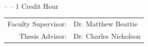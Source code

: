 \begin{titlepage}
    \begin{center}
        \vfill
        \Huge \myassignment \\
        \vspace*{0.5in}
        \Large \mysemester -- \myclass -- 1 Credit Hour\\
        \vspace*{0.5in}
        \myname
        \vfill
        \begin{tabular}{rl}
            Faculty Supervisor: & Dr. Matthew Beattie \\
            Thesis Advisor:     & Dr. Charles Nicholson
        \end{tabular}
        \vfill
    \end{center}
\end{titlepage}
